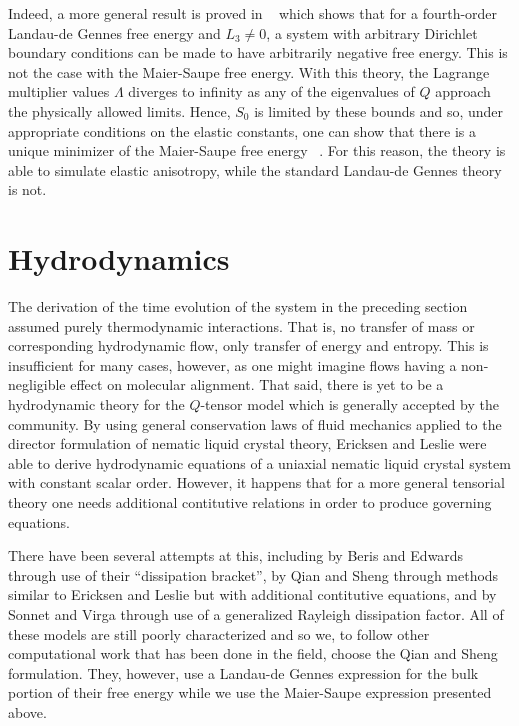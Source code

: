 \documentclass[reqno]{article}
\begin{document}
  Indeed, a more general result is proved in ~\cite{ball_nematic_2010} which
  shows that for a fourth-order Landau-de Gennes free energy and $L_3 \neq 0$, a system with
  arbitrary Dirichlet boundary conditions can be made to have arbitrarily
  negative free energy.
  This is not the case with the Maier-Saupe free energy.
  With this theory, the Lagrange multiplier values $\Lambda$ diverges to
  infinity as any of the eigenvalues of $Q$ approach the physically allowed
  limits.
  Hence, $S_0$ is limited by these bounds and so, under appropriate conditions
  on the elastic constants, one can show that there is a unique minimizer of the
  Maier-Saupe free energy ~\cite{schimming_numerical_2021}.
  For this reason, the theory is able to simulate elastic anisotropy, while the
  standard Landau-de Gennes theory is not.


  \section{Hydrodynamics}
  The derivation of the time evolution of the system in the preceding section
  assumed purely thermodynamic interactions.
  That is, no transfer of mass or corresponding hydrodynamic flow, only transfer of energy and entropy.
  This is insufficient for many cases, however, as one might imagine flows
  having a non-negligible effect on molecular alignment.
  That said, there is yet to be a hydrodynamic theory for the $Q$-tensor model
  which is generally accepted by the community.
  By using general conservation laws of fluid mechanics applied to the director
  formulation of nematic liquid crystal theory, Ericksen and Leslie were able to
  derive hydrodynamic equations of a uniaxial nematic liquid crystal system with
  constant scalar order.
  However, it happens that for a more general tensorial theory one needs
  additional contitutive relations in order to produce governing equations.

  There have been several attempts at this, including by Beris and Edwards
  through use of their ``dissipation bracket'', by Qian and Sheng through
  methods similar to Ericksen and Leslie but with additional contitutive
  equations, and by Sonnet and Virga through use of a generalized Rayleigh
  dissipation factor.
  All of these models are still poorly characterized and so we, to follow other
  computational work that has been done in the field, choose the Qian and Sheng
  formulation.
  They, however, use a Landau-de Gennes expression for the bulk portion of their
  free energy while we use the Maier-Saupe expression presented above.
\end{document}
